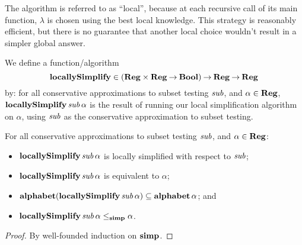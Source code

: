 The algorithm is referred to as ``local'', because at each recursive
call of its main function, $\lambda$ is chosen using the best local
knowledge.  This strategy is reasonably efficient, but there is no
guarantee that another local choice wouldn't result in a simpler
global answer.

We define a function/algorithm
%
\begin{displaymath}
\mathbf{locallySimplify}\in(\mathbf{Reg}\times\mathbf{Reg}\mathbin{\to}\mathbf{Bool})\mathbin{\to}\mathbf{Reg}\mathbin{\to}\mathbf{Reg}
\end{displaymath}
by: for all conservative approximations to subset testing ${\it sub}$, and
$\alpha\in\mathbf{Reg}$, $\mathbf{locallySimplify}\,{\it sub}\,\alpha$ is the result of
running our local simplification algorithm on $\alpha$, using ${\it sub}$
as the conservative approximation to subset testing.

\begin{theorem}
For all conservative approximations to subset testing ${\it sub}$,
and $\alpha\in\mathbf{Reg}$:
\begin{itemize}
\item $\mathbf{locallySimplify}\,{\it sub}\,\alpha$ is locally simplified with
  respect to ${\it sub}$;

\item $\mathbf{locallySimplify}\,{\it sub}\,\alpha$ is equivalent to $\alpha$;

\item $\mathbf{alphabet}(\mathbf{locallySimplify}\,{\it sub}\,\alpha)\subseteq\mathbf{alphabet}\,\alpha$;
  and

\item $\mathbf{locallySimplify}\,{\it sub}\,\alpha\mathrel{\leq_{\mathbf{simp}}}\alpha$.
\end{itemize}
\end{theorem}

\begin{proof}
By well-founded induction on $\mathrel{\mathbf{simp}}$.
\end{proof}

